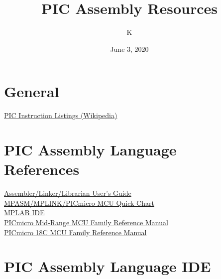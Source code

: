 \documentclass[12pt, letterpaper]{article}
\title{PIC Assembly Resources}
\author{K}
\date{June 3, 2020}
\begin{document}
\begin{comment}
\begin{titlepage}
    \maketitle
\end{titlepage}
\end{comment}

\maketitle

\tableofcontents{}
\pagebreak

\section{General}
\href{https://en.wikipedia.org/wiki/PIC_instruction_listings}{PIC Instruction Listings (Wikipedia)}

\section{PIC Assembly Language References}
\href{http://ww1.microchip.com/downloads/en/DeviceDoc/33014K.pdf}{Assembler/Linker/Librarian User's Guide}\\
\href{http://ww1.microchip.com/downloads/en/DeviceDoc/MPASM_Quick_Ref_Card_30400g.pdf}{MPASM/MPLINK/PICmicro MCU Quick Chart}\\
\href{http://ww1.microchip.com/downloads/en/DeviceDoc/51519B.pdf}{MPLAB IDE}\\
\href{http://ww1.microchip.com/downloads/en/devicedoc/33023a.pdf}{PICmicro Mid-Range MCU Family Reference Manual}\\
\href{http://ww1.microchip.com/downloads/en/DeviceDoc/39500a.pdf}{PICmicro 18C MCU Family Reference Manual}

\section{PIC Assembly Language IDE}
\end{document}
